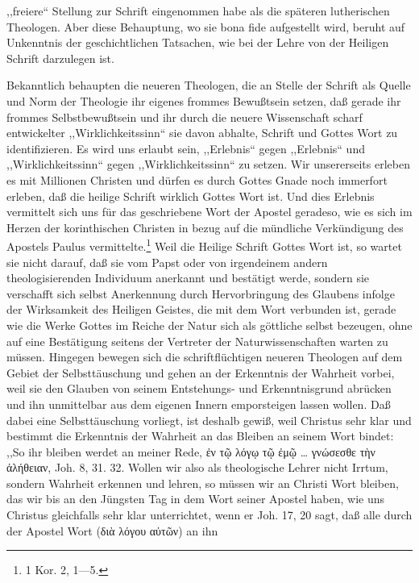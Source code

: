 ,,freiere`` Stellung zur Schrift eingenommen habe als die späteren lutherischen Theologen. Aber diese Behauptung, wo sie bona fide aufgestellt wird, beruht auf Unkenntnis der geschichtlichen Tatsachen, wie bei der Lehre von der Heiligen Schrift darzulegen ist.\par Bekanntlich behaupten die neueren Theologen, die an Stelle der Schrift als Quelle und Norm der Theologie ihr eigenes frommes Bewußtsein setzen, daß gerade ihr frommes Selbstbewußtsein und ihr durch die neuere Wissenschaft scharf entwickelter ,,Wirklichkeitssinn`` sie davon abhalte, Schrift und Gottes Wort zu identifizieren. Es wird uns erlaubt sein, ,,Erlebnis`` gegen ,,Erlebnis`` und ,,Wirklichkeitssinn`` gegen ,,Wirklichkeitssinn`` zu setzen. Wir unsererseits erleben es mit Millionen Christen und dürfen es durch Gottes Gnade noch immerfort erleben, daß die heilige Schrift wirklich Gottes Wort ist. Und dies Erlebnis vermittelt sich uns für das geschriebene Wort der Apostel geradeso, wie es sich im Herzen der korinthischen Christen in bezug auf die mündliche Verkündigung des Apostels Paulus vermittelte.\footnote{1 Kor. 2, 1—5.} Weil die Heilige Schrift Gottes Wort ist, so wartet sie nicht darauf, daß sie vom Papst oder von irgendeinem andern theologisierenden Individuum anerkannt und bestätigt werde, sondern sie verschafft sich selbst Anerkennung durch Hervorbringung des Glaubens infolge der Wirksamkeit des Heiligen Geistes, die mit dem Wort verbunden ist, gerade wie die Werke Gottes im Reiche der Natur sich als göttliche selbst bezeugen, ohne auf eine Bestätigung seitens der Vertreter der Naturwissenschaften warten zu müssen. Hingegen bewegen sich die schriftflüchtigen neueren Theologen auf dem Gebiet der Selbsttäuschung und gehen an der Erkenntnis der Wahrheit vorbei, weil sie den Glauben von seinem Entstehungs- und Erkenntnisgrund abrücken und ihn unmittelbar aus dem eigenen Innern emporsteigen lassen wollen. Daß dabei eine Selbsttäuschung vorliegt, ist deshalb gewiß, weil Christus sehr klar und bestimmt die Erkenntnis der Wahrheit an das Bleiben an seinem Wort bindet: ,,So ihr bleiben werdet an meiner Rede, ἐν τῷ λόγῳ τῷ ἐμῷ \dots{} γνώσεσθε τὴν ἀλήθειαν, Joh. 8, 31. 32. Wollen wir also als theologische Lehrer nicht Irrtum, sondern Wahrheit erkennen und lehren, so müssen wir an Christi Wort bleiben, das wir bis an den Jüngsten Tag in dem Wort seiner Apostel haben, wie uns Christus gleichfalls sehr klar unterrichtet, wenn er Joh. 17, 20 sagt, daß alle durch der Apostel Wort (διὰ λόγου αὐτῶν) an ihn